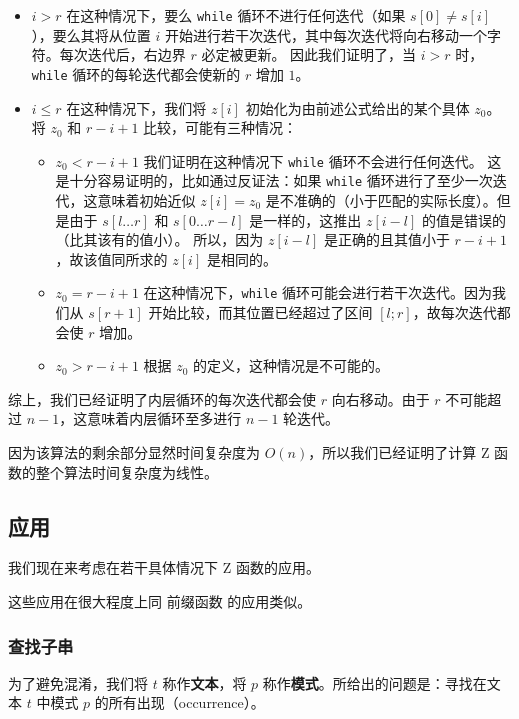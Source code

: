\begin{itemize}
\item $i > r$
在这种情况下，要么 \texttt{while} 循环不进行任何迭代（如果 $s[0] \neq s[i]$），要么其将从位置 $i$ 开始进行若干次迭代，其中每次迭代将向右移动一个字符。每次迭代后，右边界 $r$ 必定被更新。
因此我们证明了，当 $i > r$ 时，\texttt{while} 循环的每轮迭代都会使新的 $r$ 增加 $1$。
\item $i \le r$
在这种情况下，我们将 $z[i]$ 初始化为由前述公式给出的某个具体 $z_0$。将 $z_0$ 和 $r - i + 1$ 比较，可能有三种情况：
\begin{itemize}
\item $z_0 < r - i + 1$
我们证明在这种情况下 \texttt{while} 循环不会进行任何迭代。
这是十分容易证明的，比如通过反证法：如果 \texttt{while} 循环进行了至少一次迭代，这意味着初始近似 $z[i] = z_0$ 是不准确的（小于匹配的实际长度）。但是由于 $s[l\dots r]$ 和 $s[0\dots r - l]$ 是一样的，这推出 $z[i - l]$ 的值是错误的（比其该有的值小）。
所以，因为 $z[i - l]$ 是正确的且其值小于 $r - i + 1$，故该值同所求的 $z[i]$ 是相同的。
\item $z_0 = r - i + 1$
在这种情况下，\texttt{while} 循环可能会进行若干次迭代。因为我们从 $s[r + 1]$ 开始比较，而其位置已经超过了区间 $[l;r]$，故每次迭代都会使 $r$ 增加。
\item $z_0 > r - i + 1$
根据 $z_0$ 的定义，这种情况是不可能的。
\end{itemize}
\end{itemize}

综上，我们已经证明了内层循环的每次迭代都会使 $r$ 向右移动。由于 $r$ 不可能超过 $n - 1$，这意味着内层循环至多进行 $n - 1$ 轮迭代。

因为该算法的剩余部分显然时间复杂度为 $O(n)$，所以我们已经证明了计算 Z 函数的整个算法时间复杂度为线性。

\subsection{应用}

我们现在来考虑在若干具体情况下 Z 函数的应用。

这些应用在很大程度上同 前缀函数 的应用类似。

\subsubsection{查找子串}

为了避免混淆，我们将 $t$ 称作\textbf{文本}，将 $p$ 称作\textbf{模式}。所给出的问题是：寻找在文本 $t$ 中模式 $p$ 的所有出现（occurrence）。

